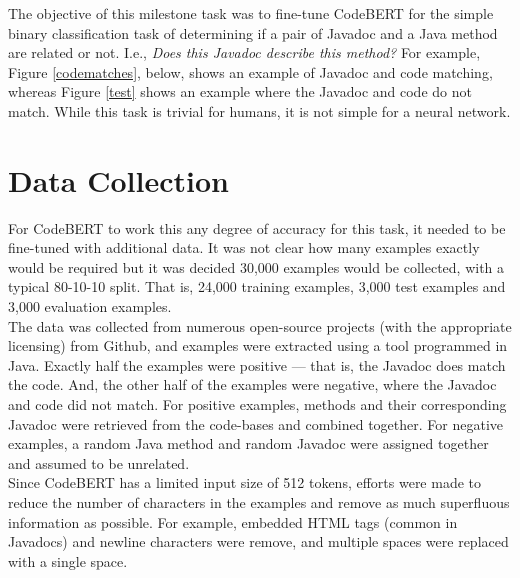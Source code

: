 \noindent
The objective of this milestone task was to fine-tune CodeBERT for the simple binary classification task of determining if a pair of Javadoc and a Java method are related or not. I.e., \emph{Does this Javadoc describe this method?} For example, Figure \ref{codematches}, below, shows an example of Javadoc and code matching, whereas Figure \ref{test} shows an example where the Javadoc and code do not match. While this task is trivial for humans, it is not simple for a neural network.\\

\section{Data Collection}

\noindent
For CodeBERT to work this any degree of accuracy for this task, it needed to be fine-tuned with additional data. It was not clear how many examples exactly would be required but it was decided 30,000 examples would be collected, with a typical 80-10-10 split. That is, 24,000 training examples, 3,000 test examples and 3,000 evaluation examples.\\

\noindent
The data was collected from numerous open-source projects (with the appropriate licensing) from Github, and examples were extracted using a tool programmed in Java. Exactly half the examples were positive --- that is, the Javadoc does match the code. And, the other half of the examples were negative, where the Javadoc and code did not match. For positive examples, methods and their corresponding Javadoc were retrieved from the code-bases and combined together. For negative examples, a random Java method and random Javadoc were assigned together and assumed to be unrelated.\\

\noindent
Since CodeBERT has a limited input size of 512 tokens, efforts were made to reduce the number of characters in the examples and remove as much superfluous information as possible. For example, embedded HTML tags (common in Javadocs) and newline characters were remove, and multiple spaces were replaced with a single space.\\

